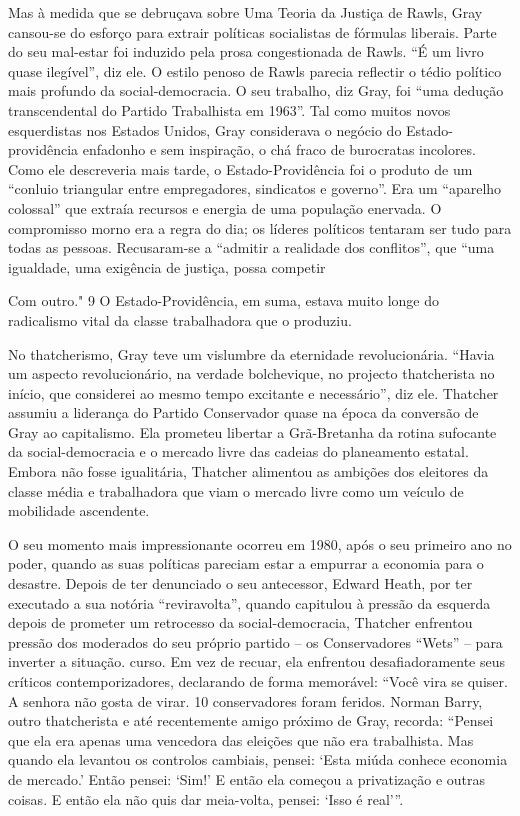  \par 
Mas à medida que se debruçava sobre Uma Teoria da Justiça de Rawls, Gray cansou-se do esforço para extrair políticas socialistas de fórmulas liberais. Parte do seu mal-estar foi induzido pela prosa congestionada de Rawls. “É um livro quase ilegível”, diz ele. O estilo penoso de Rawls parecia reflectir o tédio político mais profundo da social-democracia. O seu trabalho, diz Gray, foi “uma dedução transcendental do Partido Trabalhista em 1963”. Tal como muitos novos esquerdistas nos Estados Unidos, Gray considerava o negócio do Estado-providência enfadonho e sem inspiração, o chá fraco de burocratas incolores. Como ele descreveria mais tarde, o Estado-Providência foi o produto de um “conluio triangular entre empregadores, sindicatos e governo”. Era um “aparelho colossal” que extraía recursos e energia de uma população enervada. O compromisso morno era a regra do dia; os líderes políticos tentaram ser tudo para todas as pessoas. Recusaram-se a “admitir a realidade dos conflitos”, que “uma igualdade, uma exigência de justiça, possa competir
 \par 
Com outro." {\color{blue}9} O Estado-Providência, em suma, estava muito longe do radicalismo vital da classe trabalhadora que o produziu.
 \par 
No thatcherismo, Gray teve um vislumbre da eternidade revolucionária. “Havia um aspecto revolucionário, na verdade bolchevique, no projecto thatcherista no início, que considerei ao mesmo tempo excitante e necessário”, diz ele. Thatcher assumiu a liderança do Partido Conservador quase na época da conversão de Gray ao capitalismo. Ela prometeu libertar a Grã-Bretanha da rotina sufocante da social-democracia e o mercado livre das cadeias do planeamento estatal. Embora não fosse igualitária, Thatcher alimentou as ambições dos eleitores da classe média e trabalhadora que viam o mercado livre como um veículo de mobilidade ascendente.
 \par 
O seu momento mais impressionante ocorreu em 1980, após o seu primeiro ano no poder, quando as suas políticas pareciam estar a empurrar a economia para o desastre. Depois de ter denunciado o seu antecessor, Edward Heath, por ter executado a sua notória “reviravolta”, quando capitulou à pressão da esquerda depois de prometer um retrocesso da social-democracia, Thatcher enfrentou pressão dos moderados do seu próprio partido – os Conservadores “Wets” – para inverter a situação. curso. Em vez de recuar, ela enfrentou desafiadoramente seus críticos contemporizadores, declarando de forma memorável: “Você vira se quiser. A senhora não gosta de virar. {\color{blue}10} conservadores foram feridos. Norman Barry, outro thatcherista e até recentemente amigo próximo de Gray, recorda: “Pensei que ela era apenas uma vencedora das eleições que não era trabalhista. Mas quando ela levantou os controlos cambiais, pensei: ‘Esta miúda conhece economia de mercado.’ Então pensei: ‘Sim!’ E então ela começou a privatização e outras coisas. E então ela não quis dar meia-volta, pensei: ‘Isso é real’”.
